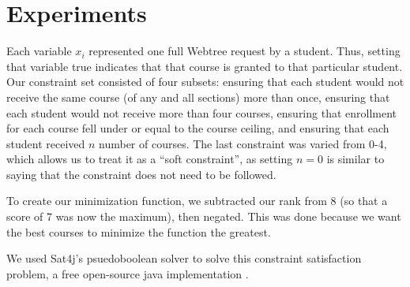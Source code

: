 
\section{Experiments}
\label{sec:expts}

Each variable $x_i$ represented one full Webtree request by a
student. Thus, setting that variable true indicates that that course
is granted to that particular student. Our constraint set consisted of
four subsets: ensuring that each student would not receive the same
course (of any and all sections) more than once, ensuring that each
student would not receive more than four courses, ensuring that
enrollment for each course fell under or equal to the course ceiling,
and ensuring that each student received $n$ number of courses. The
last constraint was varied from {0-4}, which allows us to treat it as
a ``soft constraint'', as setting $n=0$ is similar to saying that
the constraint does not need to be followed. 

To create our minimization function, we subtracted our rank from 8 (so
that a score of 7 was now the maximum), then negated. This was done
because we want the best courses to minimize the function the greatest.


We used Sat4j's psuedoboolean solver to solve this constraint
satisfaction problem, a free open-source java implementation \cite{sat4j}.
